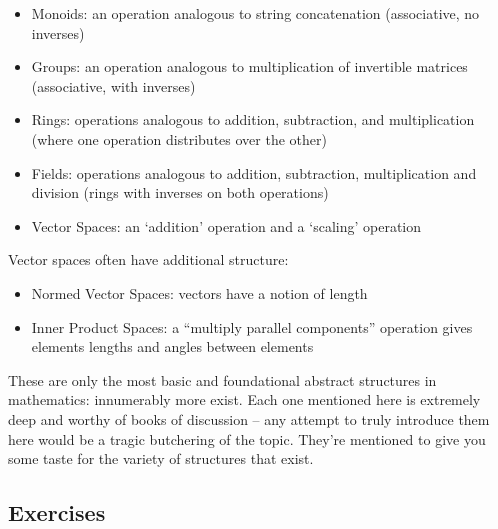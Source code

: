 \documentclass{report}
\begin{document}
\begin{itemize}
\item Monoids: an operation analogous to string concatenation (associative, no inverses)
\item Groups: an operation analogous to multiplication of invertible matrices (associative, with inverses)
\item Rings: operations analogous to addition, subtraction, and multiplication (where one operation distributes over the other)
\item Fields: operations analogous to addition, subtraction, multiplication and division (rings with inverses on both operations)
\item Vector Spaces: an `addition' operation and a `scaling' operation
\end{itemize}

Vector spaces often have additional structure:

\begin{itemize}
\item Normed Vector Spaces: vectors have a notion of length
\item Inner Product Spaces: a ``multiply parallel components'' operation gives elements lengths and angles between elements
\end{itemize}

These are only the most basic and foundational abstract structures in mathematics: innumerably more exist. Each one mentioned here is extremely deep and worthy of books of discussion -- any attempt to truly introduce them here would be a tragic butchering of the topic. They're mentioned to give you some taste for the variety of structures that exist.

\subsection*{Exercises}
\end{document}
